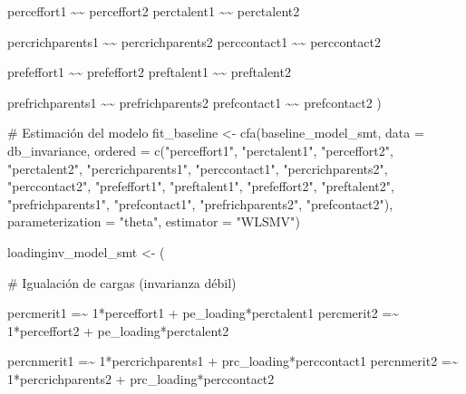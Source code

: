 \documentclass[
  12pt,
]{article}
\newenvironment{Shaded}{\begin{snugshade}}{\end{snugshade}}
\newcommand{\AttributeTok}[1]{\textcolor[rgb]{0.40,0.45,0.13}{#1}}
\newcommand{\CommentTok}[1]{\textcolor[rgb]{0.37,0.37,0.37}{#1}}
\newcommand{\FunctionTok}[1]{\textcolor[rgb]{0.28,0.35,0.67}{#1}}
\newcommand{\NormalTok}[1]{\textcolor[rgb]{0.00,0.23,0.31}{#1}}
\newcommand{\OtherTok}[1]{\textcolor[rgb]{0.00,0.23,0.31}{#1}}
\newcommand{\StringTok}[1]{\textcolor[rgb]{0.13,0.47,0.30}{#1}}
\begin{document}
\begin{Shaded}
\begin{Highlighting}[]
\StringTok{perceffort1 \textasciitilde{}\textasciitilde{} perceffort2}
\StringTok{perctalent1 \textasciitilde{}\textasciitilde{} perctalent2}

\StringTok{percrichparents1 \textasciitilde{}\textasciitilde{} percrichparents2}
\StringTok{perccontact1     \textasciitilde{}\textasciitilde{} perccontact2}

\StringTok{prefeffort1 \textasciitilde{}\textasciitilde{} prefeffort2}
\StringTok{preftalent1 \textasciitilde{}\textasciitilde{} preftalent2}

\StringTok{prefrichparents1 \textasciitilde{}\textasciitilde{} prefrichparents2}
\StringTok{prefcontact1     \textasciitilde{}\textasciitilde{} prefcontact2}
\StringTok{\textquotesingle{}}\NormalTok{)}



\CommentTok{\# Estimación del modelo}
\NormalTok{fit\_baseline }\OtherTok{\textless{}{-}} \FunctionTok{cfa}\NormalTok{(baseline\_model\_smt, }\AttributeTok{data =}\NormalTok{ db\_invariance,}
                    \AttributeTok{ordered =} \FunctionTok{c}\NormalTok{(}\StringTok{"perceffort1"}\NormalTok{, }\StringTok{"perctalent1"}\NormalTok{, }\StringTok{"perceffort2"}\NormalTok{, }\StringTok{"perctalent2"}\NormalTok{,}
                                \StringTok{"percrichparents1"}\NormalTok{, }\StringTok{"perccontact1"}\NormalTok{, }\StringTok{"percrichparents2"}\NormalTok{, }\StringTok{"perccontact2"}\NormalTok{,}
                                \StringTok{"prefeffort1"}\NormalTok{, }\StringTok{"preftalent1"}\NormalTok{, }\StringTok{"prefeffort2"}\NormalTok{, }\StringTok{"preftalent2"}\NormalTok{,}
                                \StringTok{"prefrichparents1"}\NormalTok{, }\StringTok{"prefcontact1"}\NormalTok{, }\StringTok{"prefrichparents2"}\NormalTok{, }\StringTok{"prefcontact2"}\NormalTok{),}
                    \AttributeTok{parameterization =} \StringTok{"theta"}\NormalTok{,}
                    \AttributeTok{estimator =} \StringTok{"WLSMV"}\NormalTok{)}


\NormalTok{loadinginv\_model\_smt }\OtherTok{\textless{}{-}}\NormalTok{ (}\StringTok{\textquotesingle{}}

\StringTok{\# Igualación de cargas (invarianza débil)}

\StringTok{percmerit1  =\textasciitilde{} 1*perceffort1 + pe\_loading*perctalent1}
\StringTok{percmerit2  =\textasciitilde{} 1*perceffort2 + pe\_loading*perctalent2}

\StringTok{percnmerit1 =\textasciitilde{} 1*percrichparents1 + prc\_loading*perccontact1}
\StringTok{percnmerit2 =\textasciitilde{} 1*percrichparents2 + prc\_loading*perccontact2}


\end{Highlighting}
\end{Shaded}
\end{document}
